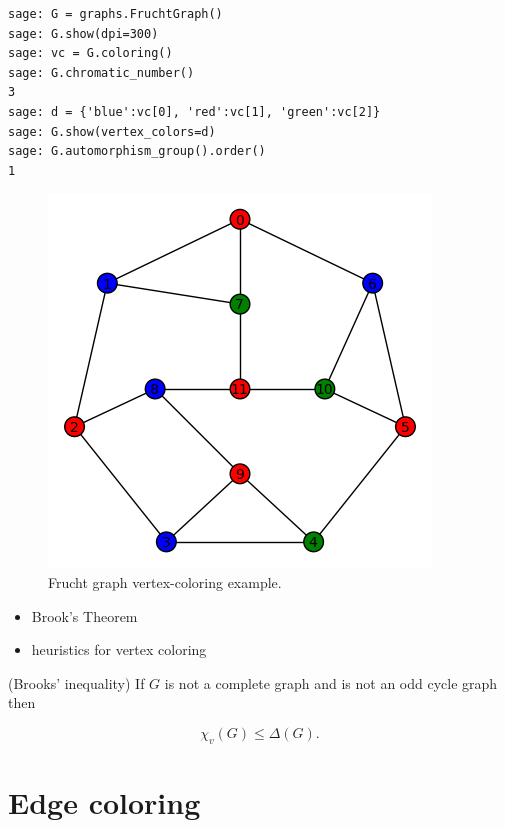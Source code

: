 \begin{lstlisting}
sage: G = graphs.FruchtGraph()
sage: G.show(dpi=300)
sage: vc = G.coloring()
sage: G.chromatic_number()
3
sage: d = {'blue':vc[0], 'red':vc[1], 'green':vc[2]}
sage: G.show(vertex_colors=d)
sage: G.automorphism_group().order()
1
\end{lstlisting}

\begin{figure}[!htbp]
\centering
{}
\includegraphics{image/graph-coloring/frucht-graph-vertex-coloring-example}
\caption{Frucht graph vertex-coloring example.}
\label{fig:graph_coloring:frucht_graph_vertex_coloring_example}
\end{figure}

\begin{itemize}
\item Brook's Theorem
\item heuristics for vertex coloring
\end{itemize}

\begin{theorem}
(Brooks' inequality)
If $G$ is not a complete graph and is not an odd cycle graph then

\[
    \chi_v(G) \le \Delta(G).
\]
\end{theorem}


\section{Edge coloring}


